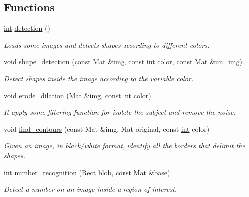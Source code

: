 \subsection*{Functions}
\begin{DoxyCompactItemize}
\item 
\mbox{\hyperlink{draw_8hh_aa620a13339ac3a1177c86edc549fda9b}{int}} \mbox{\hyperlink{detection_8hh_a17e13c447692201697b084a1906cf6fb}{detection}} ()
\begin{DoxyCompactList}\small\item\em Loads some images and detects shapes according to different colors. \end{DoxyCompactList}\item 
void \mbox{\hyperlink{detection_8hh_ac47563337453ac7d1314fe83218c87fc}{shape\+\_\+detection}} (const Mat \&img, const \mbox{\hyperlink{draw_8hh_aa620a13339ac3a1177c86edc549fda9b}{int}} color, const Mat \&un\+\_\+img)
\begin{DoxyCompactList}\small\item\em Detect shapes inside the image according to the variable \textquotesingle{}color\textquotesingle{}. \end{DoxyCompactList}\item 
void \mbox{\hyperlink{detection_8hh_a28d0cdb56cfb2164f939dc2f83d1d9d0}{erode\+\_\+dilation}} (Mat \&img, const \mbox{\hyperlink{draw_8hh_aa620a13339ac3a1177c86edc549fda9b}{int}} color)
\begin{DoxyCompactList}\small\item\em It apply some filtering function for isolate the subject and remove the noise. \end{DoxyCompactList}\item 
void \mbox{\hyperlink{detection_8hh_a93844a9ac3d8be0bd871bb41f8260330}{find\+\_\+contours}} (const Mat \&img, Mat original, const \mbox{\hyperlink{draw_8hh_aa620a13339ac3a1177c86edc549fda9b}{int}} color)
\begin{DoxyCompactList}\small\item\em Given an image, in black/white format, identify all the borders that delimit the shapes. \end{DoxyCompactList}\item 
\mbox{\hyperlink{draw_8hh_aa620a13339ac3a1177c86edc549fda9b}{int}} \mbox{\hyperlink{detection_8hh_a785fcf35ca81d113a1ea3d831fbdbc22}{number\+\_\+recognition}} (Rect blob, const Mat \&base)
\begin{DoxyCompactList}\small\item\em Detect a number on an image inside a region of interest. \end{DoxyCompactList}\item 

\end{DoxyCompactItemize}
